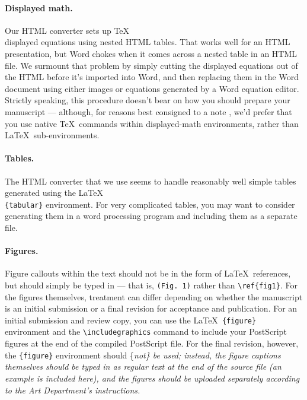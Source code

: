 \documentclass[12pt]{article}
\begin{document}
\paragraph*{Displayed math.}

Our HTML converter sets up \TeX\\
displayed equations using nested HTML tables. That works well for an
HTML presentation, but Word chokes when it comes across a nested table
in an HTML file. We surmount that problem by simply cutting the
displayed equations out of the HTML before it's imported into Word, and
then replacing them in the Word document using either images or
equations generated by a Word equation editor. Strictly speaking, this
procedure doesn't bear on how you should prepare your manuscript ---
although, for reasons best consigned to a note \cite{nattex}, we'd
prefer that you use native \TeX~commands within displayed-math
environments, rather than \LaTeX~sub-environments.

\paragraph*{Tables.}

The HTML converter that we use seems to handle reasonably well simple
tables generated using the \LaTeX\\
\texttt{\{tabular\}} environment. For very complicated tables, you may
want to consider generating them in a word processing program and
including them as a separate file.

\paragraph*{Figures.}

Figure callouts within the text should not be in the form of
\LaTeX~references, but should simply be typed in --- that is,
\verb+(Fig. 1)+ rather than \verb+\ref{fig1}+. For the figures
themselves, treatment can differ depending on whether the manuscript is
an initial submission or a final revision for acceptance and
publication. For an initial submission and review copy, you can use the
\LaTeX~\verb+{figure}+ environment and the \verb+\includegraphics+
command to include your PostScript figures at the end of the compiled
PostScript file. For the final revision, however, the \verb+{figure}+
environment should \{\it not\/\} be used; instead, the figure captions
themselves should be typed in as regular text at the end of the source
file (an example is included here), and the figures should be uploaded
separately according to the Art Department's instructions.
\end{document}
